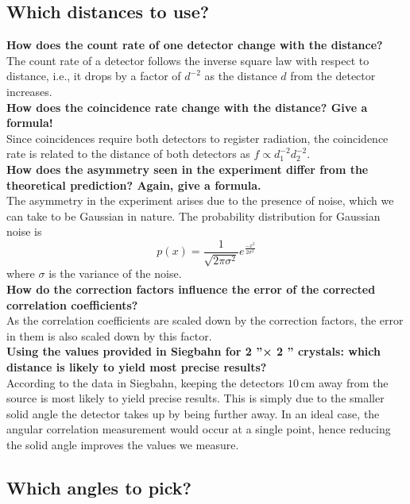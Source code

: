 \subsection{Which distances to use?}

\textbf{How does the count rate of one detector change with the distance?}\\
The count rate of a detector follows the inverse square law with respect to distance, i.e., it drops by a factor of $d^{-2}$ as the distance $d$ from the detector increases.\\

\textbf{How does the coincidence rate change with the distance? Give a formula!}\\
Since coincidences require both detectors to register radiation, the coincidence rate is related to the distance of both detectors as $f \propto d_1^{-2}d_2^{-2}$.\\

\textbf{How does the asymmetry seen in the experiment differ from the theoretical prediction? Again, give a formula.}\\
The asymmetry in the experiment arises due to the presence of noise, which we can take to be Gaussian in nature. The probability distribution for Gaussian noise is
$$p(x) = \frac{1}{\sqrt{2\pi\sigma^2}}e^{\frac{-x^2}{2\sigma^2}}$$
where $\sigma$ is the variance of the noise.\\

\textbf{How do the correction factors influence the error of the corrected correlation coefficients?}\\
As the correlation coefficients are scaled down by the correction factors, the error in them is also scaled down by this factor.\\

\textbf{Using the values provided in Siegbahn for 2 ”× 2 ” crystals: which distance is likely to yield most precise results?}\\
According to the data in Siegbahn, keeping the detectors $10\,$cm away from the source is most likely to yield precise results. This is simply due to the smaller solid angle the detector takes up by being further away. In an ideal case, the angular correlation measurement would occur at a single point, hence reducing the solid angle improves the values we measure.\\

\subsection{Which angles to pick?}

